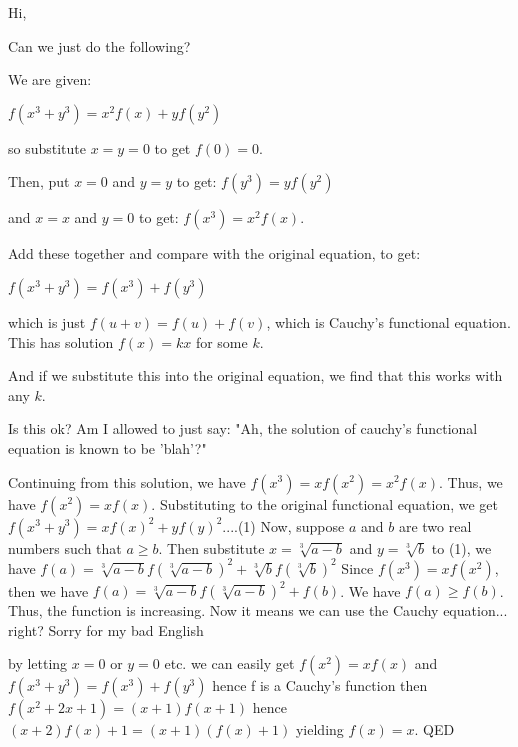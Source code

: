 \begin{mysolution}
	\begin{tcolorbox}Hi,

Can we just do the following?

We are given:

$ f(x^{3} + y^{3}) = x^{2}f(x) + yf(y^2)$

so substitute $ x = y = 0$ to get $ f(0) = 0$.

Then, put $ x = 0$ and $ y = y$ to get: $ f(y^{3}) = y f(y^{2})$

and $ x = x$ and $ y = 0$ to get: $ f(x^{3}) = x^{2}f(x)$.

Add these together and compare with the original equation, to get:

$ f(x^{3} + y^{3}) = f(x^{3}) + f(y^{3})$

which is just $ f(u + v) = f(u) + f(v)$, which is Cauchy's functional equation. This has solution $ f(x) = kx$ for some $ k$.

And if we substitute this into the original equation, we find that this works with any $ k$.

Is this ok? Am I allowed to just say: "Ah, the solution of cauchy's functional equation is known to be 'blah'?"\end{tcolorbox}

Continuing from this solution, we have $ f(x^3)=xf(x^2)=x^2f(x)$. Thus, we have $ f(x^2)=xf(x)$.
Substituting to the original functional equation, we get $ f(x^3+y^3)=xf(x)^{2}+yf(y)^{2}$....(1)
Now, suppose $ a$ and $ b$ are two real numbers such that $ a \geq b$.
Then substitute $ x= \sqrt[3]{a-b}$ and $ y=\sqrt[3]{b}$ to (1), we have $ f(a)=\sqrt[3]{a-b}f(\sqrt[3]{a-b})^2 + \sqrt[3]{b}f(\sqrt[3]{b})^2$
Since $ f(x^3)=xf(x^2)$, then we have
$ f(a)=\sqrt[3]{a-b}f(\sqrt[3]{a-b})^2 + f(b)$. We have $ f(a) \geq f(b)$.
Thus, the function is increasing.
Now it means we can use the Cauchy equation... right?
Sorry for my bad English
\end{mysolution}



\begin{mysolution}
	by letting $x=0$ or $y=0$ etc. we can easily get $f(x^2)=xf(x)$ and $f(x^3+y^3)=f(x^3)+f(y^3)$
hence f is a Cauchy's function
then $f(x^2+2x+1)=(x+1)f(x+1)$
hence $(x+2)f(x)+1=(x+1)(f(x)+1)$
yielding $f(x)=x$.
QED
\end{mysolution}



